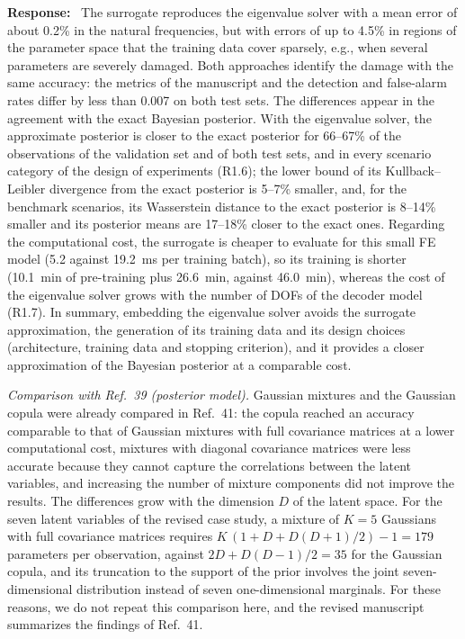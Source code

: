 \documentclass[11pt]{article}
\newenvironment{response}{\par\smallskip\noindent\color{resp}\textbf{Response:}\ }{\par}
\begin{document}
\begin{response}
The surrogate reproduces the eigenvalue solver with a mean error of about 0.2\% in the natural frequencies, but with errors
of up to 4.5\% in regions of the parameter space that the training data cover sparsely, e.g., when several parameters are
severely damaged. Both approaches identify the damage with the same accuracy: the metrics of the manuscript and the
detection and false-alarm rates differ by less than 0.007 on both test sets. The differences appear in the agreement with
the exact Bayesian posterior. With the eigenvalue solver, the approximate posterior is closer to the exact posterior for
66--67\% of the observations of the validation set and of both test sets, and in every scenario category of the design of
experiments (R1.6); the lower bound of its Kullback--Leibler divergence from the exact posterior is 5--7\% smaller, and, for
the benchmark scenarios, its Wasserstein distance to the exact posterior is 8--14\% smaller and its posterior means are
17--18\% closer to the exact ones. Regarding the computational cost, the surrogate is cheaper to evaluate for this small FE
model (5.2 against 19.2~ms per training batch), so its training is shorter (10.1~min of pre-training plus 26.6~min, against
46.0~min), whereas the cost of the eigenvalue solver grows with the number of DOFs of the decoder model (R1.7). In summary,
embedding the eigenvalue solver avoids the surrogate approximation, the generation of its training data and its design
choices (architecture, training data and stopping criterion), and it provides a closer approximation of the Bayesian
posterior at a comparable cost.

\textit{Comparison with Ref.~39 (posterior model).} Gaussian mixtures and the Gaussian copula were already compared in
Ref.~41: the copula reached an accuracy comparable to that of Gaussian mixtures with full covariance matrices at a lower
computational cost, mixtures with diagonal covariance matrices were less accurate because they cannot capture the
correlations between the latent variables, and increasing the number of mixture components did not improve the results.
The differences grow with the dimension $D$ of the latent space. For the seven latent variables of the revised case study, a
mixture of $K=5$ Gaussians with full covariance matrices requires $K\,(1+D+D(D+1)/2)-1=179$ parameters per observation,
against $2D+D(D-1)/2=35$ for the Gaussian copula, and its truncation to the support of the prior involves the joint
seven-dimensional distribution instead of seven one-dimensional marginals. For these reasons, we do not repeat this
comparison here, and the revised manuscript summarizes the findings of Ref.~41.
\end{response}
\end{document}
